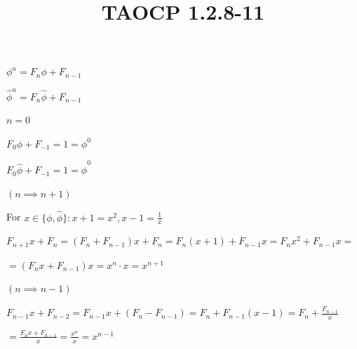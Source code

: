 \documentclass{article}
\title{TAOCP 1.2.8\mbox{-}11}
\begin{document}
\maketitle

\( \phi^{n} = F_{n} \phi + F_{n-1} \)

\( \widehat{\phi}^{n} = F_{n} \widehat{\phi} + F_{n-1} \)

\( n = 0 \)

\( F_{0} \phi + F_{-1} = 1 = \phi^{0} \)

\( F_{0} \widehat{\phi} + F_{-1} = 1 = \widehat{\phi}^{0} \)

\( (n \implies n + 1) \)

For \( x \in \{ \phi, \widehat{\phi} \}: x + 1 = x^{2}, x - 1 = \frac{1}{x} \)

\( F_{n+1} x + F_{n} = (F_{n} + F_{n-1})x + F_{n} = F_{n}(x+1) + F_{n-1} x = F_{n}x^{2} + F_{n-1}x = \)

\( = (F_{n}x + F_{n-1})x = x^{n} \cdot x = x^{n+1} \)

\( (n \implies n - 1) \)

\( F_{n-1} x + F_{n-2} = F_{n-1} x + (F_{n} - F_{n-1}) = F_{n} + F_{n-1} (x - 1) = F_{n} + \frac{F_{n-1}}{x} \)

\( = \frac{F_{n}x + F_{n-1}}{x} = \frac{x^{n}}{x} = x^{n-1} \)
\end{document}

